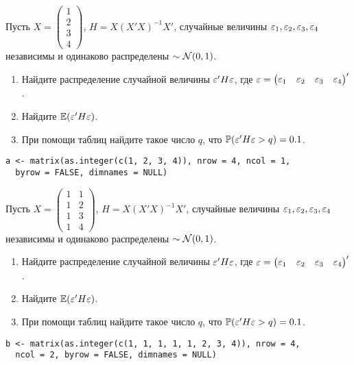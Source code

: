 \begin{problem}

Пусть $X = \begin{pmatrix} 1 \\ 2 \\ 3 \\ 4 \end{pmatrix}$, $H = X(X'X)^{-1}X'$, случайные величины $\varepsilon_1, \varepsilon_2, \varepsilon_3, \varepsilon_4$ независимы и одинаково распределены $\sim \mathcal{N}(0,1)$.
\begin{enumerate}
\item Найдите распределение случайной величины $\varepsilon'H\varepsilon$, где $\varepsilon = \begin{pmatrix} \varepsilon_1 & \varepsilon_2 & \varepsilon_3 & \varepsilon_4 \end{pmatrix}'$.
\item Найдите $\mathbb{E}(\varepsilon'H\varepsilon)$.
\item При помощи таблиц найдите такое число $q$, что $\mathbb{P}(\varepsilon'H\varepsilon > q)=0.1$.
\end{enumerate}


\begin{sol}
\begin{verbatim}
a <- matrix(as.integer(c(1, 2, 3, 4)), nrow = 4, ncol = 1,
  byrow = FALSE, dimnames = NULL)
\end{verbatim}

\end{sol}
\end{problem}



\begin{problem}

Пусть $X = \begin{pmatrix} 1 & 1 \\ 1 & 2 \\ 1 & 3 \\ 1 & 4 \end{pmatrix}$, $H = X(X'X)^{-1}X'$, случайные величины $\varepsilon_1, \varepsilon_2, \varepsilon_3, \varepsilon_4$ независимы и одинаково распределены $\sim \mathcal{N}(0,1)$.
\begin{enumerate}
\item Найдите распределение случайной величины $\varepsilon'H\varepsilon$, где $\varepsilon = \begin{pmatrix} \varepsilon_1 & \varepsilon_2 & \varepsilon_3 & \varepsilon_4 \end{pmatrix}'$.
\item Найдите $\mathbb{E}(\varepsilon'H\varepsilon)$.
\item При помощи таблиц найдите такое число $q$, что $\mathbb{P}(\varepsilon'H\varepsilon > q)=0.1$.
\end{enumerate}


\begin{sol}

\begin{verbatim}
b <- matrix(as.integer(c(1, 1, 1, 1, 1, 2, 3, 4)), nrow = 4,
  ncol = 2, byrow = FALSE, dimnames = NULL)
\end{verbatim}
\end{sol}
\end{problem}



